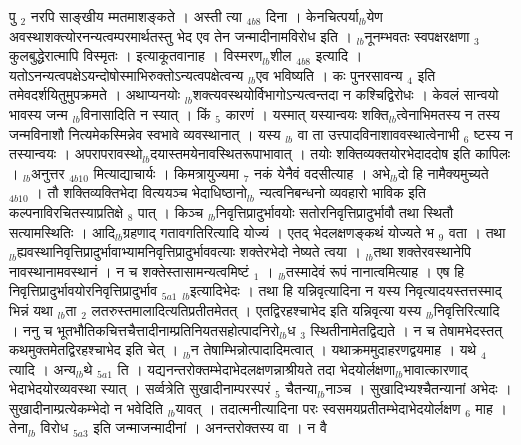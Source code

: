 \documentclass[article,12pt,a4paper]{memoir}%
\begin{document}
	  
	  \pstart \leavevmode%
	पु {\tiny $_{2}$} नरपि {\color{DodgerBlue3}साङ्खीय} म्मतमाशङ्कते । {\color{DodgerBlue3}अस्ती} त्या {\tiny $_{4b8}$} दिना । केनचित्पर्या{\tiny $_{lb}$}येण अवस्थाशक्त्योरनन्यत्वम्परमार्थतस्तु भेद एव तेन जन्मादीनामविरोध इति । {\tiny $_{lb}$}नूनम्भवतः स्वपक्षरक्षणा {\tiny $_{3}$} कुलबुद्धेरात्मापि विस्मृतः । इत्याकूतवानाह । {\color{DodgerBlue3}विस्मरण{\tiny $_{lb}$}शील} {\tiny $_{4b8}$} इत्यादि । यतोऽनन्यत्वपक्षेऽयन्दोषोस्माभिरुक्तोऽन्यत्वपक्षेत्वन्य {\tiny $_{lb}$}एव भविष्यति । कः पुनरसावन्य {\tiny $_{4}$} इति तमेवदर्शयितुमुपक्रमते । अथाप्यनयोः {\tiny $_{lb}$}शक्त्यवस्थयोर्विभागोऽन्यत्वन्तदा न कश्चिद्विरोधः । केवलं सान्वयो भावस्य जन्म {\tiny $_{lb}$}विनासादिति न स्यात् । किं {\tiny $_{5}$} कारणं । यस्मात् यस्यान्वयः शक्ति{\tiny $_{lb}$}त्वेनाभिमतस्य न तस्य जन्मविनाशौ नित्यमेकस्मिन्नेव स्वभावे व्यवस्थानात् । यस्य {\tiny $_{lb}$} \leavevmode{} वा ता उत्त्पादविनाशाववस्थात्वेनाभी {\tiny $_{6}$} ष्टस्य न तस्यान्वयः । अपरापरावस्थो{\tiny $_{lb}$}दयास्तमयेनावस्थितरूपाभावात् । तयोः शक्तिव्यक्तयोरभेदाददोष इति {\color{DodgerBlue3}कापिलः । {\tiny $_{lb}$}अनुत्तर} {\tiny $_{4b10}$} {\color{DodgerBlue3}मित्याद्याचार्यः} । किमत्रायुज्यमा {\tiny $_{7}$} नकं येनैवं वदसीत्याह । {\color{DodgerBlue3}अभे{\tiny $_{lb}$}दो हि नामैक्यमुच्यते} {\tiny $_{4b10}$} । तौ शक्तिव्यक्तिभेदा {\color{DodgerBlue3}वित्ययञ्च} भेदाधिष्ठानो{\tiny $_{lb}$} {\color{DodgerBlue3}न्यत्वनिबन्धनो व्यवहारो भाविक} इति कल्पनाविरचितस्याप्रतिक्षे {\tiny $_{8}$} पात् । किञ्च {\tiny $_{lb}$}निवृत्तिप्रादुर्भावयोः सतोरनिवृत्तिप्रादुर्भावौ तथा स्थितौ सत्यामस्थितिः । आदि{\tiny $_{lb}$}ग्रहणाद् गतावगतिरित्यादि योज्यं । एतद् भेदलक्षणङ्कथं योज्यते भ {\tiny $_{9}$} \leavevmode{} वता । तथा{\tiny $_{lb}$}ह्यवस्थानिवृत्तिप्रादुर्भावाभ्यामनिवृत्तिप्रादुर्भाववत्याः शक्तेरभेदो नेष्यते त्वया । {\tiny $_{lb}$}तथा शक्तेरवस्थानेपि नावस्थानामवस्थानं । न च शक्तेस्तासामन्यत्वमिष्टं {\tiny $_{1}$} । {\tiny $_{lb}$}तस्मादेवं रूपं नानात्वमित्याह । एष हि {\color{DodgerBlue3}निवृत्तिप्रादुर्भावयोरनिवृत्तिप्रादुर्भाव} {\tiny $_{5a1}$} {\tiny $_{lb}$}इत्यादिभेदः । तथा हि यन्निवृत्यादिना न यस्य निवृत्यादयस्तत्तस्माद् भिन्नं यथा {\tiny $_{lb}$}ता {\tiny $_{2}$} लतरुस्तमालादित्यतिप्रतीतमेतत् । एतद्विरहश्चाभेद इति यन्निवृत्या यस्य {\tiny $_{lb}$}निवृत्तिरित्यादि । ननु च भूतभौतिकचित्तचैत्तादीनाम्प्रतिनियतसहोत्पादनिरो{\tiny $_{lb}$}ध {\tiny $_{3}$} स्थितीनामेतद्विद्यते । न च तेषामभेदस्तत् कथमुक्तमेतद्विरहश्चाभेद इति चेत् । {\tiny $_{lb}$}न तेषाम्भिन्नोत्पादादिमत्वात् । यथाक्रममुदाहरणद्वयमाह । {\color{DodgerBlue3}यथे} {\tiny $_{4}$} त्यादि । अन्य{\tiny $_{lb}$}थे {\tiny $_{5a1}$} ति । यद्यनन्तरोक्तम्भेदाभेदलक्षणन्नाश्रीयते तदा भेदयोर्लक्षणा{\tiny $_{lb}$}भावात्कारणाद् भेदाभेदयोरव्यवस्था स्यात् । सर्व्वत्रेति सुखादीनाम्परस्परं {\tiny $_{5}$} चैतन्या{\tiny $_{lb}$}नाञ्च । सुखादिभ्यश्चैतन्यानां अभेदः । सुखादीनाम्प्रत्येकम्भेदो न भवेदिति {\tiny $_{lb}$}यावत् । तदात्मनीत्यादिना परः स्वसमयप्रतीतम्भेदाभेदयोर्लक्षण {\tiny $_{6}$} माह । {\color{DodgerBlue3}तेना{\tiny $_{lb}$}\leavevmode{} विरोध} {\tiny $_{5a3}$} इति जन्माजन्मादीनां । अनन्तरोक्तस्य वा । न वै 
\end{document}
